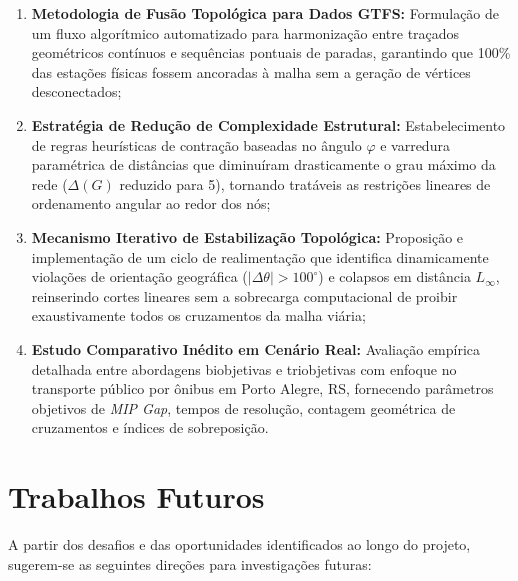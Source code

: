 \documentclass[cic,tc]{infufrgs}
\begin{document}
\begin{enumerate}
    \item \textbf{Metodologia de Fusão Topológica para Dados GTFS:} Formulação de um fluxo algorítmico automatizado para harmonização entre traçados geométricos contínuos e sequências pontuais de paradas, garantindo que 100\% das estações físicas fossem ancoradas à malha sem a geração de vértices desconectados;
    \item \textbf{Estratégia de Redução de Complexidade Estrutural:} Estabelecimento de regras heurísticas de contração baseadas no ângulo $\varphi$ e varredura paramétrica de distâncias que diminuíram drasticamente o grau máximo da rede ($\Delta(G)$ reduzido para 5), tornando tratáveis as restrições lineares de ordenamento angular ao redor dos nós;
    \item \textbf{Mecanismo Iterativo de Estabilização Topológica:} Proposição e implementação de um ciclo de realimentação que identifica dinamicamente violações de orientação geográfica ($|\Delta\theta| > 100^\circ$) e colapsos em distância $L_\infty$, reinserindo cortes lineares sem a sobrecarga computacional de proibir exaustivamente todos os cruzamentos da malha viária;
    \item \textbf{Estudo Comparativo Inédito em Cenário Real:} Avaliação empírica detalhada entre abordagens biobjetivas e triobjetivas com enfoque no transporte público por ônibus em Porto Alegre, RS, fornecendo parâmetros objetivos de \textit{MIP Gap}, tempos de resolução, contagem geométrica de cruzamentos e índices de sobreposição.
\end{enumerate}

\section{Trabalhos Futuros}
\label{sec:trabalhos_futuros}

A partir dos desafios e das oportunidades identificados ao longo do projeto, sugerem-se as seguintes direções para investigações futuras:
\end{document}
